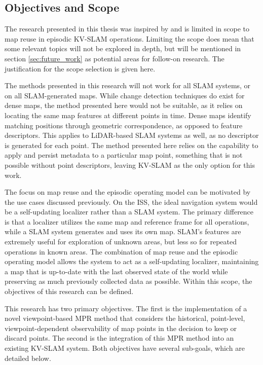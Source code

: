 \subsection{Objectives and Scope}
\label{sec:objectives}

The research presented in this thesis was inspired by and is limited in scope to map reuse in episodic KV-SLAM operations. Limiting the scope does mean that some relevant topics will not be explored in depth, but will be mentioned in section \ref{sec:future_work} as potential areas for follow-on research. The justification for the scope selection is given here.

The methods presented in this research will not work for all SLAM systems, or on all SLAM-generated maps. While change detection techniques do exist for dense maps, the method presented here would not be suitable, as it relies on locating the same map features at different points in time. Dense maps identify matching positions through geometric correspondence, as opposed to feature descriptors. This applies to LiDAR-based SLAM systems as well, as no descriptor is generated for each point. The method presented here relies on the capability to apply and persist metadata to a particular map point, something that is not possible without point descriptors, leaving KV-SLAM as the only option for this work.

The focus on map reuse and the episodic operating model can be motivated by the use cases discussed previously. On the ISS, the ideal navigation system would be a self-updating localizer rather than a SLAM system. The primary difference is that a localizer utilizes the same map and reference frame for all operations, while a SLAM system generates and uses its own map. SLAM's features are extremely useful for exploration of unknown areas, but less so for repeated operations in known areas. The combination of map reuse and the episodic operating model allows the system to act as a self-updating localizer, maintaining a map that is up-to-date with the last observed state of the world while preserving as much previously collected data as possible. Within this scope, the objectives of this research can be defined.

This research has two primary objectives. The first is the implementation of a novel viewpoint-based MPR method that considers the historical, point-level, viewpoint-dependent observability of map points in the decision to keep or discard points. The second is the integration of this MPR method into an existing KV-SLAM system. Both objectives have several sub-goals, which are detailed below.

